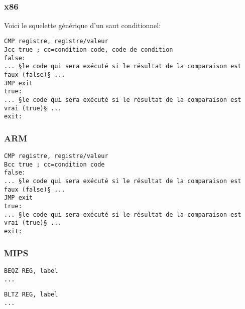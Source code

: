 \label{sec:Jcc}






\subsection{\Conclusion{}}

\subsubsection{x86}

Voici le squelette générique d'un saut conditionnel:

\begin{lstlisting}[caption=x86,style=customasmx86]
CMP registre, registre/valeur
Jcc true ; cc=condition code, code de condition
false:
... §le code qui sera exécuté si le résultat de la comparaison est faux (false)§ ...
JMP exit 
true:
... §le code qui sera exécuté si le résultat de la comparaison est vrai (true)§ ...
exit:
\end{lstlisting}

\subsubsection{ARM}

\begin{lstlisting}[caption=ARM,style=customasmARM]
CMP registre, registre/valeur
Bcc true ; cc=condition code
false:
... §le code qui sera exécuté si le résultat de la comparaison est faux (false)§ ...
JMP exit 
true:
... §le code qui sera exécuté si le résultat de la comparaison est vrai (true)§ ...
exit:
\end{lstlisting}

\subsubsection{MIPS}

\begin{lstlisting}[caption=Check si zéro (Branch if EQual Zero),style=customasmMIPS]
BEQZ REG, label
...
\end{lstlisting}

\begin{lstlisting}[caption=Check si plus petit que zéro (Branch if Less Than Zero) en utilisant une pseudo instruction,style=customasmMIPS]
BLTZ REG, label
...
\end{lstlisting}

